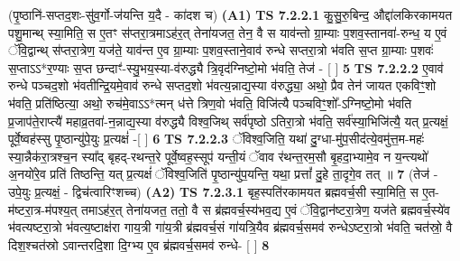 \documentclass[17pt]{extarticle}
\begin{document}
                  \newline
                      (पृ॒ष्ठानि॑-सप्तद॒शः-सु॑व॒र्गो-ज॑यन्ति य॒दै - का॑दश च)  \textbf{(A1)} \newline \newline
                                        \textbf{ TS 7.2.2.1} \newline
                  कु॒सु॒रु॒बिन्द॒ औद्दा॑लकिरकामयत पशु॒मान्थ् स्या॒मिति॒ स ए॒तꣳ स॑प्तरा॒त्रमाऽह॑र॒त् तेना॑यजत॒ तेन॒ वै स याव॑न्तो ग्रा॒म्याः प॒शव॒स्तानवा॑-रुन्ध॒ य ए॒वं ॅवि॒द्वान्थ् स॑प्तरा॒त्रेण॒ यज॑ते॒ याव॑न्त ए॒व ग्रा॒म्याः प॒शव॒स्ताने॒वाव॑ रुन्धे सप्तरा॒त्रो भ॑वति स॒प्त ग्रा॒म्याः प॒शवः॑ स॒प्ताऽऽ*र॒ण्याः स॒प्त छन्दाꣳ॑-स्यु॒भय॒स्या-व॑रुद्ध्यै त्रि॒वृद॑ग्निष्टो॒मो भ॑वति॒ तेज॑ - [  ] \textbf{  5} \newline
                  \newline
                                \textbf{ TS 7.2.2.2} \newline
                  ए॒वाव॑ रुन्धे पञ्चद॒शो भ॑वतीन्द्रि॒यमे॒वाव॑ रुन्धे सप्तद॒शो भ॑वत्य॒न्नाद्य॒स्या व॑रुद्ध्या॒ अथो॒ प्रैव तेन॑ जायत एकविꣳ॒॒शो भ॑वति॒ प्रति॑ष्ठित्या॒ अथो॒ रुच॑मे॒वाऽऽ*त्मन् ध॑त्ते त्रिण॒वो भ॑वति॒ विजि॑त्यै पञ्चविꣳ॒॒शो᳚-ऽग्निष्टो॒मो भ॑वति प्र॒जाप॑ते॒राप्त्यै॑ महाव्र॒तवा॑-न॒न्नाद्य॒स्या व॑रुद्ध्यै विश्व॒जिथ् सर्व॑पृष्ठो ऽतिरा॒त्रो भ॑वति॒ सर्व॑स्या॒भिजि॑त्यै॒ यत् प्र॒त्यक्षं॒ पूर्वे॒ष्वह॑स्सु पृ॒ष्ठान्यु॑पे॒युः प्र॒त्यक्षं॑ -[  ] \textbf{  6} \newline
                  \newline
                                \textbf{ TS 7.2.2.3} \newline
                  ॅविश्व॒जिति॒ यथा॑ दु॒ग्धा-मु॑प॒सीद॑त्ये॒वमु॑त्त॒म-महः॑ स्या॒न्नैक॑रा॒त्रश्च॒न स्या᳚द् बृहद्-रथन्त॒रे पूर्वे॒ष्वह॒स्सूप॑ यन्ती॒यं ॅवाव र॑थन्त॒रम॒सौ बृ॒हदा॒भ्यामे॒व न य॒न्त्यथो॑ अ॒नयो॑रे॒व प्रति॑ तिष्ठन्ति॒ यत् प्र॒त्यक्षं॑ ॅविश्व॒जिति॑ पृ॒ष्ठान्यु॑प॒यन्ति॒ यथा॒ प्रत्तां᳚ दु॒हे ता॒दृगे॒व तत् ॥ \textbf{  7} \newline
                  \newline
                      (तेज॑ - उपे॒युः प्र॒त्यक्षं॒ - द्विच॑त्वारिꣳशच्च)  \textbf{(A2)} \newline \newline
                                        \textbf{ TS 7.2.3.1} \newline
                  बृह॒स्पति॑रकामयत ब्रह्मवर्च॒सी स्या॒मिति॒ स ए॒त-म॑ष्टरा॒त्र-म॑पश्य॒त् तमाऽह॑र॒त् तेना॑यजत॒ ततो॒ वै स ब्र॑ह्मवर्च॒स्य॑भव॒द्य ए॒वं ॅवि॒द्वान॑ष्टरा॒त्रेण॒ यज॑ते ब्रह्मवर्च॒स्ये॑व भ॑वत्यष्टरा॒त्रो भ॑वत्य॒ष्टाक्ष॑रा गाय॒त्री गा॑य॒त्री ब्र॑ह्मवर्च॒सं गा॑यत्रि॒यैव ब्र॑ह्मवर्च॒समव॑ रुन्धेऽष्टरा॒त्रो भ॑वति॒ चत॑स्रो॒ वै दिश॒श्चत॑स्रो ऽवान्तरदि॒शा दि॒ग्भ्य ए॒व ब्र॑ह्मवर्च॒समव॑ रुन्धे- [  ] \textbf{  8} \newline
\end{document}
